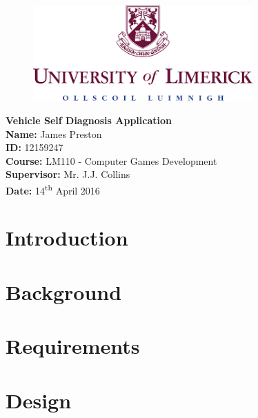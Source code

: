 \documentclass[12pt]{report}
\begin{document}
\begin{titlepage}
	\begin{center}		
		\vspace*{1cm}
		\begin{figure}[h]
			\includegraphics[width=0.75\textwidth , center]{UL.png}
		\end{figure}
		\vspace*{5cm}
		\textbf{\LARGE{Vehicle Self Diagnosis Application}}\\
		\vspace{5cm}
		\large{		
		\textbf{Name:} James Preston\\
		\textbf{ID:} 12159247\\
		\textbf{Course:} LM110 - Computer Games Development\\
		\textbf{Supervisor:} Mr. J.J. Collins\\
		\textbf{Date:} 14\textsuperscript{th} April 2016 \\
		}
	\end{center}
\end{titlepage}

	\tableofcontents
	\newpage
	
	\chapter{Introduction}
		
	\newpage 
	
	\chapter{Background}
		
	\newpage

	\chapter{Requirements}
		
	\newpage	

	\chapter{Design}
		
	\newpage
	
\end{document}
